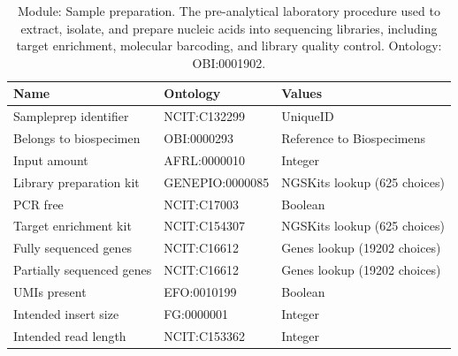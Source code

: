 \documentclass{article}
\begin{document}
\begin{table}[htb]
\begin{tabular}{lll}
Name & Ontology & Values \\
\hline
Sampleprep identifier & NCIT:C132299 & UniqueID \\
Belongs to biospecimen & OBI:0000293 & Reference to Biospecimens \\
Input amount & AFRL:0000010 & Integer \\
Library preparation kit & GENEPIO:0000085 & NGSKits lookup (625 choices) \\
PCR free & NCIT:C17003 & Boolean \\
Target enrichment kit & NCIT:C154307 & NGSKits lookup (625 choices) \\
Fully sequenced genes & NCIT:C16612 & Genes lookup (19202 choices) \\
Partially sequenced genes & NCIT:C16612 & Genes lookup (19202 choices) \\
UMIs present & EFO:0010199 & Boolean \\
Intended insert size & FG:0000001 & Integer \\
Intended read length & NCIT:C153362 & Integer \\
\hline
\end{tabular}
\caption[Module: Sample preparation]{\label{table:table11} Module: Sample preparation. The pre-analytical laboratory procedure used to extract, isolate, and prepare nucleic acids into sequencing libraries, including target enrichment, molecular barcoding, and library quality control. Ontology: OBI:0001902. }
\end{table}
\end{document}
